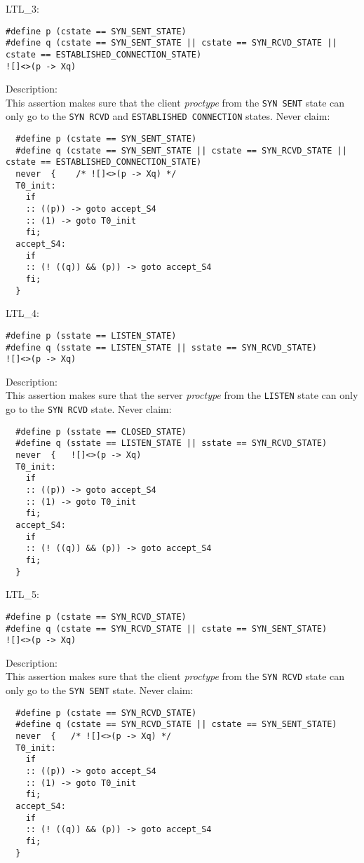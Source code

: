 \documentclass{WigReport}
\begin{document}
LTL\_3:\\
\begin{lstlisting}
#define p (cstate == SYN_SENT_STATE)
#define q (cstate == SYN_SENT_STATE || cstate == SYN_RCVD_STATE || cstate == ESTABLISHED_CONNECTION_STATE)
![]<>(p -> Xq)
\end{lstlisting}
Description:\\
This assertion makes sure that the client \textit{proctype} from the \verb|SYN SENT| state can only go to the \verb|SYN RCVD| and \verb|ESTABLISHED CONNECTION| states.
Never claim:\\
\begin{lstlisting}
  #define p (cstate == SYN_SENT_STATE)
  #define q (cstate == SYN_SENT_STATE || cstate == SYN_RCVD_STATE || cstate == ESTABLISHED_CONNECTION_STATE)
  never  {    /* ![]<>(p -> Xq) */
  T0_init:
    if
    :: ((p)) -> goto accept_S4
    :: (1) -> goto T0_init
    fi;
  accept_S4:
    if
    :: (! ((q)) && (p)) -> goto accept_S4
    fi;
  }
\end{lstlisting}


LTL\_4:\\
\begin{lstlisting}
#define p (sstate == LISTEN_STATE)
#define q (sstate == LISTEN_STATE || sstate == SYN_RCVD_STATE)
![]<>(p -> Xq)
\end{lstlisting}
Description:\\
This assertion makes sure that the server \textit{proctype} from the \verb|LISTEN| state can only go to the \verb|SYN RCVD| state.
Never claim:\\
\begin{lstlisting}
  #define p (sstate == CLOSED_STATE)
  #define q (sstate == LISTEN_STATE || sstate == SYN_RCVD_STATE)
  never  {   ![]<>(p -> Xq)
  T0_init:
    if
    :: ((p)) -> goto accept_S4
    :: (1) -> goto T0_init
    fi;
  accept_S4:
    if
    :: (! ((q)) && (p)) -> goto accept_S4
    fi;
  }
\end{lstlisting}


LTL\_5:\\
\begin{lstlisting}
#define p (cstate == SYN_RCVD_STATE)
#define q (cstate == SYN_RCVD_STATE || cstate == SYN_SENT_STATE)
![]<>(p -> Xq)
\end{lstlisting}
Description:\\
This assertion makes sure that the client \textit{proctype} from the \verb|SYN RCVD| state can only go to the \verb|SYN SENT| state.
Never claim:\\
\begin{lstlisting}
  #define p (cstate == SYN_RCVD_STATE)
  #define q (cstate == SYN_RCVD_STATE || cstate == SYN_SENT_STATE)
  never  {   /* ![]<>(p -> Xq) */
  T0_init:
    if
    :: ((p)) -> goto accept_S4
    :: (1) -> goto T0_init
    fi;
  accept_S4:
    if
    :: (! ((q)) && (p)) -> goto accept_S4
    fi;
  }
\end{lstlisting}
\end{document}
